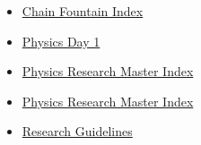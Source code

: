\documentclass[11pt]{article}
\begin{document}
\begin{itemize}
\begin{itemize}
\begin{itemize}
\item \href{physics/physics\_research/KBhPHYS210ChainFountainIndex.org}{Chain Fountain Index}
\item \href{physics/physics\_research/KBhPHYS210Day1.org}{Physics Day 1}
\item \href{physics/physics\_research/index.org}{Physics Research Master Index}
\item \href{physics/physics\_research/KBPHYS210MasterIndex.org}{Physics Research Master Index}
\item \href{physics/physics\_research/KBhPHYS210Guidelines.org}{Research Guidelines}
\end{itemize}
\end{itemize}
\end{itemize}
\end{document}
